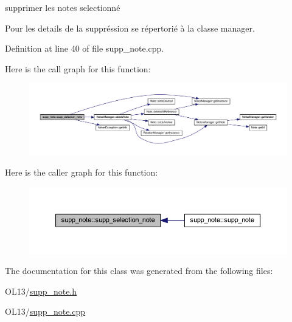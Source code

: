 supprimer les notes selectionné 

Pour les details de la suppréssion se répertorié à la classe manager. 

Definition at line 40 of file supp\+\_\+note.\+cpp.

Here is the call graph for this function\+:\nopagebreak
\begin{figure}[H]
\begin{center}
\leavevmode
\includegraphics[width=350pt]{classsupp__note_a5dbf6d3af5c94d71f42eeb2cf626c9d3_cgraph}
\end{center}
\end{figure}
Here is the caller graph for this function\+:\nopagebreak
\begin{figure}[H]
\begin{center}
\leavevmode
\includegraphics[width=350pt]{classsupp__note_a5dbf6d3af5c94d71f42eeb2cf626c9d3_icgraph}
\end{center}
\end{figure}


The documentation for this class was generated from the following files\+:\begin{DoxyCompactItemize}
\item 
O\+L13/\hyperlink{supp__note_8h}{supp\+\_\+note.\+h}\item 
O\+L13/\hyperlink{supp__note_8cpp}{supp\+\_\+note.\+cpp}\end{DoxyCompactItemize}
